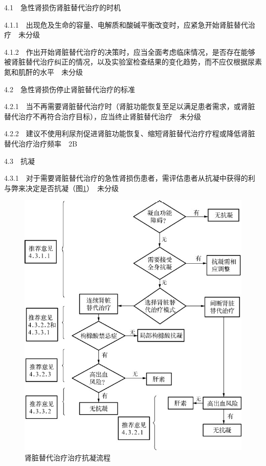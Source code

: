 4.1　急性肾损伤肾脏替代治疗的时机

4.1.1　出现危及生命的容量、电解质和酸碱平衡改变时，应紧急开始肾脏替代治疗　未分级

4.1.2　作出开始肾脏替代治疗的决策时，应当全面考虑临床情况，是否存在能够被肾脏替代治疗纠正的情况，以及实验室检查结果的变化趋势，而不应仅根据尿素氮和肌酐的水平　未分级

4.2　急性肾损伤停止肾脏替代治疗的标准

4.2.1　当不再需要肾脏替代治疗时（肾脏功能恢复至足以满足患者需求，或肾脏替代治疗不再符合治疗目标），应当终止肾脏替代治疗　未分级

4.2.2　建议不使用利尿剂促进肾脏功能恢复、缩短肾脏替代治疗疗程或降低肾脏替代治疗治疗频率　2B

4.3　抗凝

4.3.1　对于需要肾脏替代治疗的急性肾损伤患者，需评估患者从抗凝中获得的利与弊来决定是否抗凝（图\ref{figapp-1}）　未分级


\begin{figure}[!htbp]
    \centering
    \includegraphics{./images/Image00322.jpg}
    \captionsetup{justification=centering}
    \caption{肾脏替代治疗治疗抗凝流程}
    \label{figapp-1}
\end{figure} 

